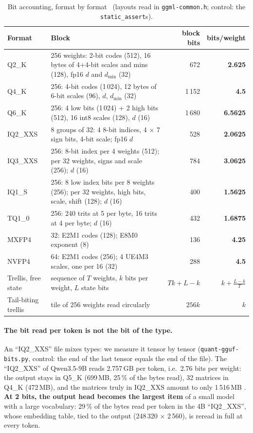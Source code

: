 \begin{table}[ht]
\centering\small
\caption[Bits per weight, format by format]{Bit accounting, format by format \calc~(layouts read in \texttt{ggml-common.h}; control: the \texttt{static\_assert}s).}
\label{tab:bits-formats}
\begin{tabularx}{\linewidth}{@{}lXrr@{}}
\toprule
Format & Block & block bits & bits/weight \\
\midrule
Q2\_K & 256 weights: 2-bit codes (512), 16 bytes of 4+4-bit scales and mins (128), fp16 $d$ and $d_{\min}$ (32) & 672 & \textbf{2.625} \\
Q4\_K & 256: 4-bit codes (1\,024), 12 bytes of 6-bit scales (96), $d$, $d_{\min}$ (32) & 1\,152 & \textbf{4.5} \\
Q6\_K & 256: 4 low bits (1\,024) + 2 high bits (512), 16 int8 scales (128), $d$ (16) & 1\,680 & \textbf{6.5625} \\
IQ2\_XXS & 8 groups of 32: 4 8-bit indices, 4 $\times$ 7 sign bits, 4-bit scale; fp16 $d$ & 528 & \textbf{2.0625} \\
IQ3\_XXS & 256: 8-bit index per 4 weights (512); per 32 weights, signs and scale (256); $d$ (16) & 784 & \textbf{3.0625} \\
IQ1\_S & 256: 8 low index bits per 8 weights (256); per 32 weights, high bits, scale, shift (128); $d$ (16) & 400 & \textbf{1.5625} \\
TQ1\_0 & 256: 240 trits at 5 per byte, 16 trits at 4 per byte; $d$ (16) & 432 & \textbf{1.6875} \\
MXFP4 & 32: E2M1 codes (128); E8M0 exponent (8) & 136 & \textbf{4.25} \\
NVFP4 & 64: E2M1 codes (256); 4 UE4M3 scales, one per 16 (32) & 288 & \textbf{4.5} \\
Trellis, free state & sequence of $T$ weights, $k$ bits per weight, $L$ state bits & $Tk + L - k$ & $k + \frac{L-k}{T}$ \\
Tail-biting trellis & tile of 256 weights read circularly & $256k$ & $k$ \\
\bottomrule
\end{tabularx}
\end{table}

\paragraph{The bit read per token is not the bit of the type.} An \enquote{IQ2\_XXS} file mixes types: we measure it tensor by tensor (\texttt{quant-gguf-bits.py}, control: the end of the last tensor equals the end of the file). The \enquote{IQ2\_XXS} of Qwen3.5-9B reads 2.757\,GB per token, i.e.\ 2.76 bits per weight: the output stays in Q5\_K (699\,MB, 25\,\% of the bytes read), 32 matrices in Q4\_K (472\,MB), and the matrices truly in IQ2\_XXS amount to only 1\,516\,MB \mes. \textbf{At 2 bits, the output head becomes the largest item} of a small model with a large vocabulary: 29\,\% of the bytes read per token in the 4B \enquote{IQ2\_XXS}, whose embedding table, tied to the output (248\,320 $\times$ 2\,560), is reread in full at every token.

